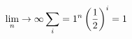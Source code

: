 \documentclass[preview]{standalone}
\begin{document}
\begin{align*}
\lim_ n \to \infty  \sum_ i=1 ^ n   \left(   1    \over  2  \right)^i  =    1
\end{align*}
\end{document}
